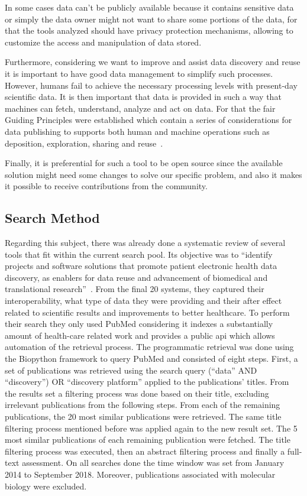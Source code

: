 In some cases data can't be publicly available because it contains sensitive data or
simply the data owner might not want to share some portions of the data, for that the
tools analyzed should have privacy protection mechanisms, allowing to customize the
access and manipulation of data stored.

Furthermore, considering we want to improve and assist data discovery and reuse it is
important to have good data management to simplify such processes.
However, humans fail to achieve the necessary processing levels with present-day
scientific data.
It is then important that data is provided in such a way that machines can fetch,
understand, analyze and act on data.
For that the \gls{fair} Guiding Principles were established which contain a series of
considerations for data publishing to supports both human and machine operations such
as deposition, exploration, sharing and reuse~\cite{fair}.


Finally, it is preferential for such a tool to be open source since the available
solution might need some changes to solve our specific problem, and also it makes it
possible to receive contributions from the community.

\subsection*{Search Method}

Regarding this subject, there was already done a systematic review of several tools that fit within the current search pool.
Its objective was to ``identify projects and software solutions that promote patient electronic health data discovery, as enablers for data reuse and advancement of biomedical and translational research''~\cite{systematic_review}.
From the final 20 systems, they captured their interoperability, what type of data they were providing and their after effect related to scientific results and improvements to better healthcare.
To perform their search they only used PubMed  considering it indexes a substantially amount of health-care related work and provides a public \gls{api} which allows automation of the retrieval process.
The programmatic retrieval was done using the Biopython framework to query PubMed and consisted of eight steps.
First, a set of publications was retrieved using the search query (``data'' AND ``discovery'') OR ``discovery platform'' applied to the publications' titles.
From the results set a filtering process was done based on their title, excluding irrelevant publications from the following steps.
From each of the remaining publications, the 20 most similar publications were retrieved.
The same title filtering process mentioned before was applied again to the new result set.
The 5 most similar publications of each remaining publication were fetched.
The title filtering process was executed, then an abstract filtering process and finally a full-text assessment.
On all searches done the time window was set from January 2014 to September 2018.
Moreover, publications associated with molecular biology were excluded.

